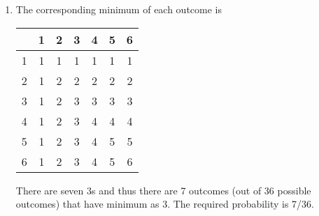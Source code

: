 {\begin{enumerate}
\begin{center}
          \end{center}
          There are five 6s and thus there are 5 outcomes (out of 36 possible outcomes)
          that have sum as 6. The
          required probability is 5/36.
        \item The corresponding minimum of each outcome is
          \begin{center}
            \begin{tabular}{c|cccccc}
              & 1 & 2 & 3 & 4 & 5 & 6\\\hline
              1 & 1 & 1 & 1 & 1 & 1 & 1\\
              2 & 1 & 2 & 2 & 2 & 2 & 2\\
              3 & 1 & 2 & 3 & 3 & 3 & 3\\
              4 & 1 & 2 & 3 & 4 & 4 & 4\\
              5 & 1 & 2 & 3 & 4 & 5 & 5\\
              6 & 1 & 2 & 3 & 4 & 5 & 6
            \end{tabular}
          \end{center}
          There are seven 3s and thus there are 7 outcomes (out of 36 possible outcomes)
          that have minimum as 3. The
          required probability is 7/36.
      \end{enumerate}
    }
    